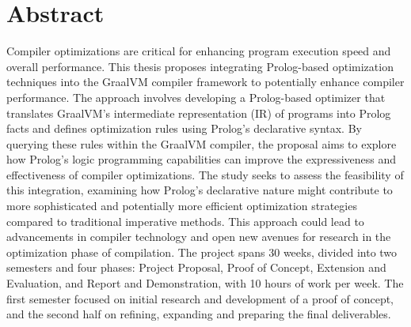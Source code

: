 \chapter[Abstract]{Abstract}

\noindent
Compiler optimizations are critical for enhancing program execution speed and overall performance. This thesis proposes integrating Prolog-based optimization techniques into the GraalVM compiler framework to potentially enhance compiler performance. The approach involves developing a Prolog-based optimizer that translates GraalVM’s intermediate representation (IR) of programs into Prolog facts and defines optimization rules using Prolog’s declarative syntax. By querying these rules within the GraalVM compiler, the proposal aims to explore how Prolog’s logic programming capabilities can improve the expressiveness and effectiveness of compiler optimizations. The study seeks to assess the feasibility of this integration, examining how Prolog’s declarative nature might contribute to more sophisticated and potentially more efficient optimization strategies compared to traditional imperative methods. This approach could lead to advancements in compiler technology and open new avenues for research in the optimization phase of compilation. The project spans 30 weeks, divided into two semesters and four phases: Project Proposal, Proof of Concept, Extension and Evaluation, and Report and Demonstration, with 10 hours of work per week. The first semester focused on initial research and development of a proof of concept, and the second half on refining, expanding and preparing the final deliverables.